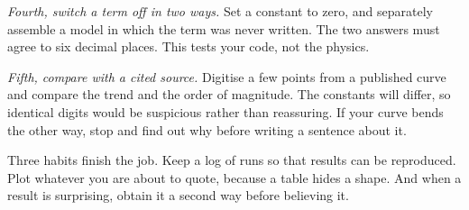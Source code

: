 \documentclass[11pt]{article}
\begin{document}
\textit{Fourth, switch a term off in two ways.} Set a constant to zero, and separately assemble a model in
which the term was never written. The two answers must agree to six decimal places. This tests your code, not
the physics.

\textit{Fifth, compare with a cited source.} Digitise a few points from a published curve and compare the
trend and the order of magnitude. The constants will differ, so identical digits would be suspicious rather
than reassuring. If your curve bends the other way, stop and find out why before writing a sentence about it.

Three habits finish the job. Keep a log of runs so that results can be reproduced. Plot whatever you are
about to quote, because a table hides a shape. And when a result is surprising, obtain it a second way before
believing it.
\end{document}
